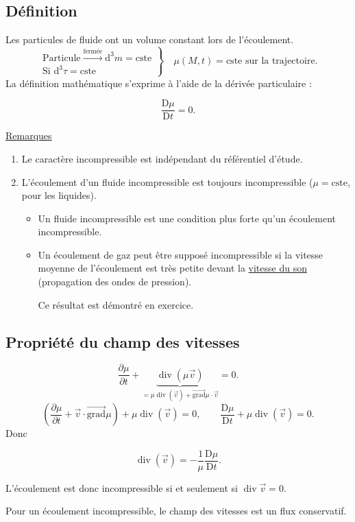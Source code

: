 \documentclass[11pt,a4paper]{article}
\newcommand{\dd}{\mathrm d}
\newcommand{\vv}{\vec v}
\newcommand{\grad}{\overrightarrow{\mathrm{grad}}}
\newcommand{\ddiv}{\operatorname{div}}
\newcommand{\Dt}[1]{\frac{\mathrm D #1}{\mathrm D t}}
\newcommand{\pd}[2]{\frac{\partial #1}{\partial #2}}
\begin{document}
\subsection{Définition}
Les particules de fluide ont un volume constant lors de l'écoulement.
\[
\left.\begin{array}{l}
\text{Particule}\xrightarrow{\text{fermée}}\dd^3m=\mathrm{cste}\\[8pt]
\text{Si }\dd^3\tau=\mathrm{cste}
\end{array}\right\}\quad
\boxed{\mu(M,t)=\mathrm{cste}\text{ sur la trajectoire}}.
\]
La définition mathématique s’exprime à l’aide de la dérivée particulaire :
\begin{cadre}\[\Dt{\mu}=0.\]\end{cadre}
\underline{Remarques}
\begin{enumerate}[label=\arabic*),leftmargin=7mm]
\item Le caractère incompressible est indépendant du référentiel d'étude.
\item L'écoulement d'un fluide incompressible est toujours incompressible ($\mu=\mathrm{cste}$, pour les liquides).
 \begin{itemize}
\item Un fluide incompressible est une condition plus forte qu'un écoulement incompressible.
\item Un écoulement de gaz peut être supposé incompressible si la vitesse moyenne de l'écoulement est très petite devant la \underline{vitesse du son} (propagation des ondes de pression).\par Ce résultat est démontré en exercice.
\end{itemize}
\end{enumerate}

\newpage
\subsection{Propriété du champ des vitesses}
\[
\pd{\mu}{t}+\underbrace{\ddiv(\mu\vv)}_{=\mu\ddiv(\vv)+\grad\mu\cdot\vv}=0.
\]
\[
\left(\pd{\mu}{t}+\vv\cdot\grad\mu\right)+\mu\ddiv(\vv)=0,
\qquad\Dt{\mu}+\mu\ddiv(\vv)=0.
\]
Donc
\begin{cadre}\[\ddiv(\vv)=-\frac1\mu\Dt{\mu}.\]\end{cadre}
L’écoulement est donc incompressible si et seulement si $\ddiv\vv=0$.

Pour un écoulement incompressible, le champ des vitesses est un flux conservatif.
\end{document}
